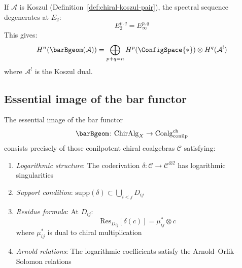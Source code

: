 \begin{corollary}
\label{cor:spectral-degeneration}
If $\mathcal{A}$ is Koszul (Definition~\ref{def:chiral-koszul-pair}), the spectral sequence degenerates at $E_2$:
\[E_2^{p,q} = E_\infty^{p,q}\]
This gives:
\[H^n(\barBgeom(\mathcal{A})) = \bigoplus_{p+q=n} H^p(\ConfigSpace{*}) \otimes H^q(\mathcal{A}^!)\]
where $\mathcal{A}^!$ is the Koszul dual.
\end{corollary}

\subsection{Essential image of the bar functor}

\begin{theorem}
\label{thm:essential-image-bar}
The essential image of the bar functor 
\[\barBgeom\colon \mathrm{ChirAlg}_X \to \mathrm{Coalg}_{\mathrm{conilp}}^{\mathrm{ch}}\]
consists precisely of those conilpotent chiral coalgebras $\mathcal{C}$ satisfying:
\begin{enumerate}
\item \emph{Logarithmic structure}: The coderivation $\delta: \mathcal{C} \to \mathcal{C}^{\otimes 2}$ has logarithmic singularities
\item \emph{Support condition}: $\text{supp}(\delta) \subset \bigcup_{i<j} D_{ij}$
\item \emph{Residue formula}: At $D_{ij}$:
\[\text{Res}_{D_{ij}}[\delta(c)] = \mu_{ij}^* \otimes c\]
where $\mu_{ij}^*$ is dual to chiral multiplication
\item \emph{Arnold relations}: The logarithmic coefficients satisfy the Arnold--Orlik--Solomon relations
\end{enumerate}
\end{theorem}

